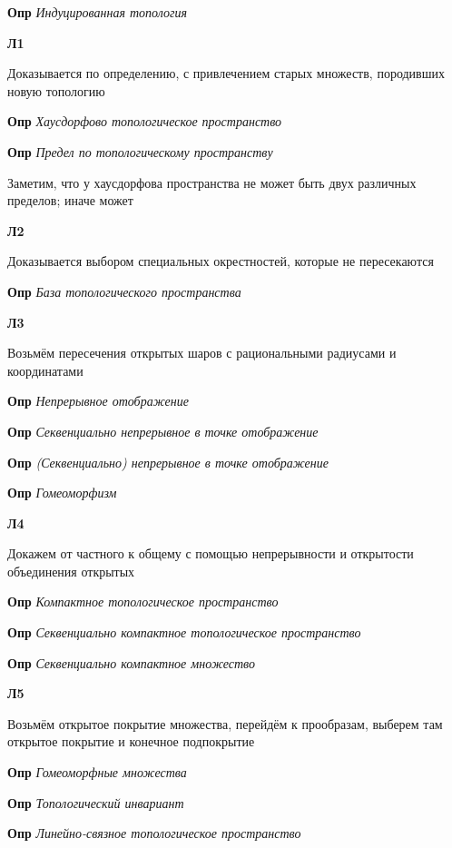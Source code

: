 \documentclass[a4paper, 14pt]{article}
\begin{document}
    \textbf{Опр} \textit{Индуцированная топология}
    
    \textbf{Л1}
    
    Доказывается по определению, с привлечением старых множеств, породивших новую топологию
    
    \textbf{Опр} \textit{Хаусдорфово топологическое пространство}
    
    \textbf{Опр} \textit{Предел по топологическому пространству}
    
    Заметим, что у хаусдорфова пространства не может быть двух различных пределов; иначе может
    
    \textbf{Л2}
    
    Доказывается выбором специальных окрестностей, которые не пересекаются
    
    \textbf{Опр} \textit{База топологического пространства}
    
    \textbf{Л3}
    
    Возьмём пересечения открытых шаров с рациональными радиусами и координатами
    
    \textbf{Опр} \textit{Непрерывное отображение}
    
    \textbf{Опр} \textit{Секвенциально непрерывное в точке отображение}
    
    \textbf{Опр} \textit{(Секвенциально) непрерывное в точке отображение}
    
    \textbf{Опр} \textit{Гомеоморфизм}
    
    \textbf{Л4}
    
    Докажем от частного к общему с помощью непрерывности и открытости объединения открытых
    
    \textbf{Опр} \textit{Компактное топологическое пространство}
    
    \textbf{Опр} \textit{Секвенциально компактное топологическое пространство}
    
    \textbf{Опр} \textit{Секвенциально компактное множество}
    
    \textbf{Л5}
    
    Возьмём открытое покрытие множества, перейдём к прообразам, выберем там открытое покрытие и конечное подпокрытие
    
    \textbf{Опр} \textit{Гомеоморфные множества}
    
    \textbf{Опр} \textit{Топологический инвариант}
    
    \textbf{Опр} \textit{Линейно-связное топологическое пространство}
    
\end{document}
